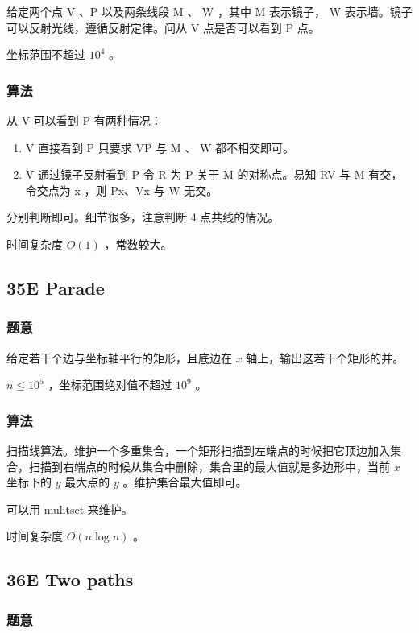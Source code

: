 \documentclass[11pt]{article}
\begin{document}
    给定两个点 V 、P 以及两条线段 M 、 W ，其中 M 表示镜子， W 表示墙。镜子可以反射光线，遵循反射定律。问从 V 点是否可以看到 P 点。

    坐标范围不超过 $10^4$ 。
\subsubsection{算法}
\label{sec-2-6-2}

    从 V 可以看到 P 有两种情况：
\begin{enumerate}
\item V 直接看到 P
         只要求 VP 与 M 、 W 都不相交即可。
\item V 通过镜子反射看到 P
         令 R 为 P 关于 M 的对称点。易知 RV 与 M 有交，令交点为 x ，则 Px、Vx 与 W 无交。
\end{enumerate}

    分别判断即可。细节很多，注意判断 4 点共线的情况。

    时间复杂度 $O(1)$ ，常数较大。
\subsection{35E   Parade}
\label{sec-2-7}
\subsubsection{题意}
\label{sec-2-7-1}

    给定若干个边与坐标轴平行的矩形，且底边在 $x$ 轴上，输出这若干个矩形的并。

    $n \leq 10^5$ ，坐标范围绝对值不超过 $10^9$ 。
\subsubsection{算法}
\label{sec-2-7-2}

    扫描线算法。维护一个多重集合，一个矩形扫描到左端点的时候把它顶边加入集合，扫描到右端点的时候从集合中删除，集合里的最大值就是多边形中，当前 $x$ 坐标下的 $y$ 最大点的 $y$ 。维护集合最大值即可。

    可以用 mulitset 来维护。

    时间复杂度 $O(n \log n)$ 。
\subsection{36E   Two paths}
\label{sec-2-8}
\subsubsection{题意}
\label{sec-2-8-1}
\end{document}
